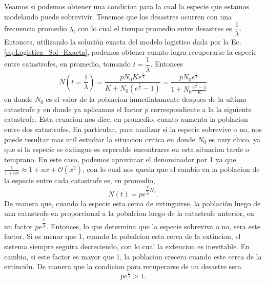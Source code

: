 Veamos si podemos obtener una condicion para la cual la especie que estamos modelando puede sobrevivir. Tenemos que los desastres ocurren con una frecuencia promedio $\lambda$, con lo cual el tiempo promedio entre desastres es $\dfrac{1}{\lambda}$. Entonces, utilizando la solución exacta del modelo logistico dada por la Ec. \ref{eq:Logistica_Sol_Exacta}, podemos obtener cuanto logra recuperarse la especie entre catastrofes, en promedio, tomando $t=\dfrac{1}{\lambda}$. Entonces
\begin{equation}
    N(t=\frac{1}{\lambda}) = \frac{pN_{0} K e^{\frac{r}{\lambda}}}{K+N_{0}(e^{\frac{r}{\lambda}}-1)} = \frac{pN_{0} e^{\frac{r}{\lambda}}}{1+N_{0}\frac{e^{\frac{r}{\lambda}}-1}{K}} 
\end{equation}
en donde $N_{0}$ es el valor de la poblacion inmediatamente despues de la ultima catastrofe y en donde ya aplicamos el factor $p$ correspondiente a la la siguiente catastrofe. Esta ecuacion nos dice, en promedio, cuanto aumenta la poblacion entre dos catastrofes. En particular, para analizar si la especie sobrevive o no, nos puede resultar mas util estudiar la situacion critica en donde $N_{0}$ es muy chico, ya que si la especie se extingue es esperable encontrarse en esta situacion tarde o temprano. En este caso, podemos aproximar el denominador por 1 ya que $\frac{1}{1+ax} \approx 1 + ax + \mathcal{O}(x^2)$, con lo cual nos queda que el cambio en la poblacion de la especie entre cada catastrofe es, en promedio,
\begin{equation}
    N(t) = pe^{\dfrac{r}{\lambda}N_{0}}.
\end{equation}
De manera que, cuando la especie esta cerca de extinguirse, la población luego de una catastrofe en proporcional a la pobalcion luego de la catastrofe anterior, en un factor $pe^{\dfrac{r}{\lambda}}$. Entonces, lo que determina que la especie sobreviva o no, sera este factor. Si es menor que 1, cuando la pobalcion esta cerca de la extincion, el sistema siempre seguira decreciendo, con lo cual la extencion es inevitable. En cambio, si este factor es mayor que 1, la poblacion crecera cuando este cerca de la extinción. De manera que la condicion para recuperarse de un desastre sera
\begin{equation}
    pe^{\frac{r}{\lambda}} > 1.
\end{equation}

